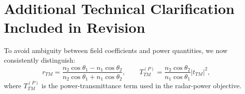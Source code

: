 \documentclass[11pt]{article}
\begin{document}
\section*{Additional Technical Clarification Included in Revision}
To avoid ambiguity between field coefficients and power quantities, we now consistently distinguish:
\begin{equation}
r_{TM} = \frac{n_2\cos\theta_1 - n_1\cos\theta_2}{n_2\cos\theta_1 + n_1\cos\theta_2},
\qquad
T_{TM}^{(P)} = \frac{n_2\cos\theta_2}{n_1\cos\theta_1}|t_{TM}|^2,
\end{equation}
where $T_{TM}^{(P)}$ is the power-transmittance term used in the radar-power objective.
\end{document}
